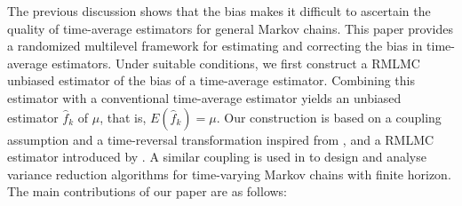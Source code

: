 \documentclass[a4paper,11pt]{article}
\begin{document}
The previous discussion shows that the  bias makes it  difficult to ascertain the quality of time-average estimators for general Markov chains. This paper provides a randomized multilevel framework for estimating and correcting the bias in time-average estimators. Under suitable conditions, we first construct a RMLMC unbiased estimator of the bias of a time-average estimator. Combining this estimator with a conventional time-average estimator yields  an unbiased estimator  \(\hat f_{k}\) of \(\mu\), that is, \(E(\hat f_{k})=\mu\).     Our construction is based on a coupling assumption and a  time-reversal transformation inspired from \citet{glynn2014exact}, and  a RMLMC estimator introduced by \citet{GlynnRhee2015unbiased}.  A similar  coupling is used in \cite{kahaRandomizedDimensionReduction20,KAHALE2022}
to design and analyse variance reduction algorithms for
time-varying
Markov chains with finite horizon. The main contributions of our paper are as follows:
\end{document}
